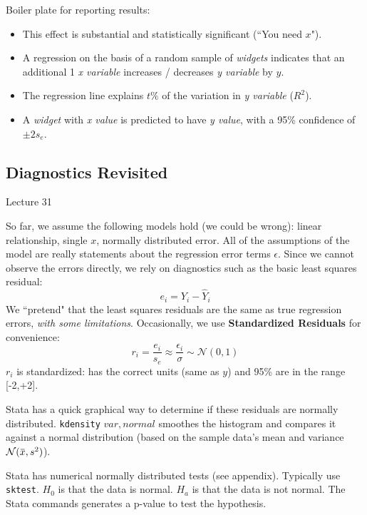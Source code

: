 \documentclass[11pt, oneside]{article}   	%
\newcommand{\overbar}[1]{\mkern 1.5mu\overline{\mkern-1.5mu#1\mkern-1.5mu}\mkern 1.5mu}
\begin{document}
Boiler plate for reporting results:

\begin{itemize}

\item{This effect is substantial and statistically significant (``You need $x$").}

\item{A regression on the basis of a random sample of \textit{widgets} indicates that an additional 1
\textit{x variable} increases / decreases \textit{y variable} by $\hat{y}$.}

\item{The regression line explains $t \%$ of the variation in \textit{y variable} ($R^2$).}

\item{A \textit{widget} with \textit{x value} is predicted to have \textit{y value}, with a 95\% confidence of $\pm 2s_e$.}
\end{itemize}

\subsection{Diagnostics Revisited}
Lecture 31

So far, we assume the following models hold (we could be wrong): linear relationship, single $x$, normally distributed error. All of the assumptions of the model are really statements about the regression error terms $\epsilon$. Since we cannot observe the errors directly, we rely on diagnostics such as the basic least squares residual:
\[
e_i = Y_i - \hat{Y}_i
\]
We ``pretend" that the least squares residuals are the same as true regression errors, \textit{with some limitations}. Occasionally, we use \textbf{Standardized Residuals} for convenience:
\[
r_i = \frac{e_i}{s_e} \approx \frac{\epsilon_i}{\sigma} \sim \mathcal{N}(0,1)
\]
$r_i$ is standardized: has the correct units (same as $y$) and 95\% are in the range [-2,+2]. 

Stata has a quick graphical way to determine if these residuals are normally distributed. \texttt{kdensity} $var, normal$ smoothes the histogram and compares it against a normal distribution (based on the sample data's mean and variance $\mathcal{N}(\overbar{x}, s^2)$).

Stata has numerical normally distributed tests (see appendix). Typically use \texttt{sktest}. $H_0$ is that the data is normal. $H_a$ is that the data is not normal. The Stata commands generates a p-value to test the hypothesis.
\end{document}
